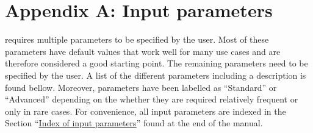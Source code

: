 \section*{Appendix A: Input parameters} \label{sec:parameters}
\setcounter{section}{1}
\renewcommand{\thesection}{\Alph{section}}

\asli{} requires multiple parameters to be specified by the user. Most of these parameters have default values that work well for many use cases and are therefore considered a good starting point. The remaining parameters need to be specified by the user. A list of the different parameters including a description is found bellow. Moreover, parameters have been labelled as ``Standard'' or ``Advanced'' depending on the whether they are required relatively frequent or only in rare cases. For convenience, all input parameters are indexed in the Section ``\hyperref[sec:index inputs full]{Index of input parameters}'' found at the end of the manual.

